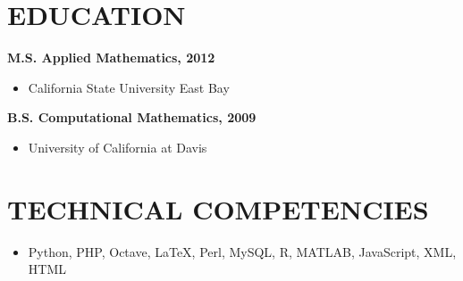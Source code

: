 \documentclass[overlapped,10pt]{res} %
\begin{document}

%

\address{    (650) 678-8889  \\ \textit{bmbentson@gmail.com}   \\ 
		}
		


\begin{resume}


\section{EDUCATION}  



\normalsize{\bf M.S. Applied Mathematics, 2012 } 
\begin{itemize}  \itemsep -2pt %
 \item[] 
 California State University East Bay
\end{itemize} 
 
		
 
\normalsize{\bf B.S. Computational Mathematics, 2009 }
 
                \begin{itemize}  \itemsep -2pt %
                    
   		  \item[] 

 			University of California at Davis
                     
                    \end{itemize} 



   

		

\section{TECHNICAL COMPETENCIES} 



	           \begin{itemize} \itemsep -2pt %
                   \item[]  Python, PHP, Octave, LaTeX, Perl, MySQL, R, MATLAB, JavaScript, XML, HTML
                   \end{itemize}



\end{resume}
\end{document}
